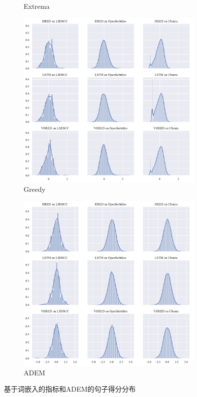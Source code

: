 \begin{figure}[H]
\begin{subfigure}{0.5\linewidth}
        \centering
        \caption{Extrema}
    \end{subfigure}
    \begin{subfigure}{0.5\linewidth}
        \includegraphics[width=\linewidth]{figure/distplot_grid/embedding_based_greedy_matching/plot.pdf}
        \centering
        \caption{Greedy}
    \end{subfigure}%
    \begin{subfigure}{0.5\linewidth}
        \includegraphics[width=\linewidth]{figure/distplot_grid/adem/plot.pdf}
        \centering
        \caption{ADEM}
    \end{subfigure}
    \caption{基于词嵌入的指标和ADEM的句子得分分布}
\end{figure}
